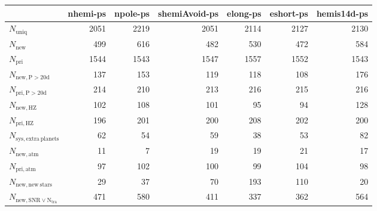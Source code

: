 \begin{tabular}{lrrrrrr}
\toprule
{} &  nhemi-ps &  npole-ps &  shemiAvoid-ps &  elong-ps &  eshort-ps &  hemis14d-ps \\
\midrule
$N_{\mathrm{uniq}}$                &      2051 &      2219 &           2051 &      2114 &       2127 &         2130 \\
$N_{\mathrm{new}}$                 &       499 &       616 &            482 &       530 &        472 &          584 \\
$N_{\mathrm{pri}}$                 &      1544 &      1543 &           1547 &      1557 &       1552 &         1543 \\
$N_{\mathrm{new,P>20d}}$           &       137 &       153 &            119 &       118 &        108 &          176 \\
$N_{\mathrm{pri,P>20d}}$           &       214 &       210 &            213 &       216 &        215 &          216 \\
$N_{\mathrm{new,HZ}}$              &       102 &       108 &            101 &        95 &         94 &          128 \\
$N_{\mathrm{pri,HZ}}$              &       196 &       201 &            200 &       208 &        202 &          200 \\
$N_{\mathrm{sys,extra\ planets}}$  &        62 &        54 &             59 &        38 &         53 &           82 \\
$N_{\mathrm{new,atm}}$             &        11 &         7 &             19 &        19 &         21 &           17 \\
$N_{\mathrm{pri,atm}}$             &        97 &       102 &            100 &        99 &        104 &           98 \\
$N_{\mathrm{new,new\ stars}}$      &        29 &        37 &             70 &       193 &        110 &           20 \\
$N_{\mathrm{new,SNR\lor N_{tra}}}$ &       471 &       580 &            411 &       337 &        362 &          564 \\
\bottomrule
\end{tabular}
